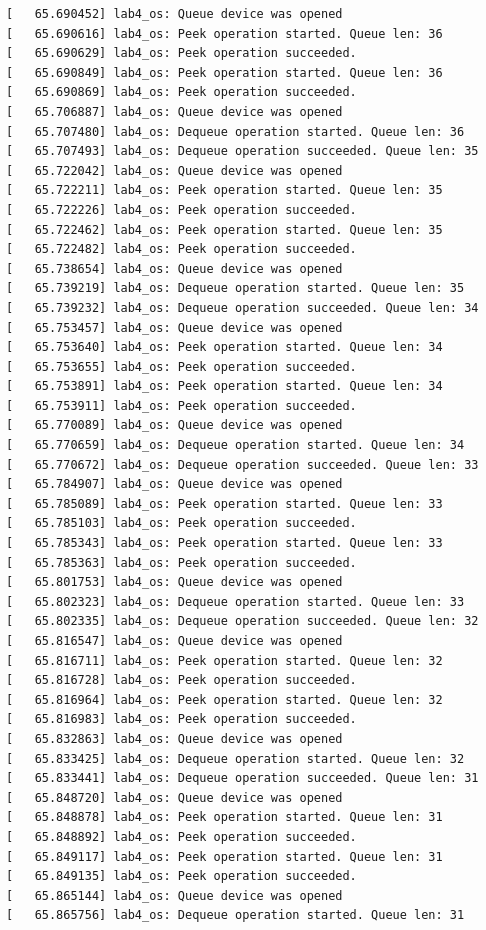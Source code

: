 \documentclass[a4paper,14pt]{extarticle}
\begin{document}
\begin{verbatim}
[   65.690452] lab4_os: Queue device was opened
[   65.690616] lab4_os: Peek operation started. Queue len: 36
[   65.690629] lab4_os: Peek operation succeeded.
[   65.690849] lab4_os: Peek operation started. Queue len: 36
[   65.690869] lab4_os: Peek operation succeeded.
[   65.706887] lab4_os: Queue device was opened
[   65.707480] lab4_os: Dequeue operation started. Queue len: 36
[   65.707493] lab4_os: Dequeue operation succeeded. Queue len: 35
[   65.722042] lab4_os: Queue device was opened
[   65.722211] lab4_os: Peek operation started. Queue len: 35
[   65.722226] lab4_os: Peek operation succeeded.
[   65.722462] lab4_os: Peek operation started. Queue len: 35
[   65.722482] lab4_os: Peek operation succeeded.
[   65.738654] lab4_os: Queue device was opened
[   65.739219] lab4_os: Dequeue operation started. Queue len: 35
[   65.739232] lab4_os: Dequeue operation succeeded. Queue len: 34
[   65.753457] lab4_os: Queue device was opened
[   65.753640] lab4_os: Peek operation started. Queue len: 34
[   65.753655] lab4_os: Peek operation succeeded.
[   65.753891] lab4_os: Peek operation started. Queue len: 34
[   65.753911] lab4_os: Peek operation succeeded.
[   65.770089] lab4_os: Queue device was opened
[   65.770659] lab4_os: Dequeue operation started. Queue len: 34
[   65.770672] lab4_os: Dequeue operation succeeded. Queue len: 33
[   65.784907] lab4_os: Queue device was opened
[   65.785089] lab4_os: Peek operation started. Queue len: 33
[   65.785103] lab4_os: Peek operation succeeded.
[   65.785343] lab4_os: Peek operation started. Queue len: 33
[   65.785363] lab4_os: Peek operation succeeded.
[   65.801753] lab4_os: Queue device was opened
[   65.802323] lab4_os: Dequeue operation started. Queue len: 33
[   65.802335] lab4_os: Dequeue operation succeeded. Queue len: 32
[   65.816547] lab4_os: Queue device was opened
[   65.816711] lab4_os: Peek operation started. Queue len: 32
[   65.816728] lab4_os: Peek operation succeeded.
[   65.816964] lab4_os: Peek operation started. Queue len: 32
[   65.816983] lab4_os: Peek operation succeeded.
[   65.832863] lab4_os: Queue device was opened
[   65.833425] lab4_os: Dequeue operation started. Queue len: 32
[   65.833441] lab4_os: Dequeue operation succeeded. Queue len: 31
[   65.848720] lab4_os: Queue device was opened
[   65.848878] lab4_os: Peek operation started. Queue len: 31
[   65.848892] lab4_os: Peek operation succeeded.
[   65.849117] lab4_os: Peek operation started. Queue len: 31
[   65.849135] lab4_os: Peek operation succeeded.
[   65.865144] lab4_os: Queue device was opened
[   65.865756] lab4_os: Dequeue operation started. Queue len: 31

\end{verbatim}
\end{document}
